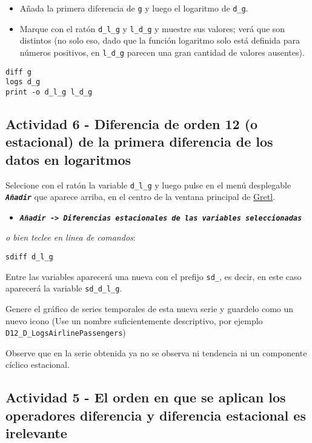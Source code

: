 \documentclass[11pt]{article}
\begin{document}
\begin{itemize}
\item Añada la primera diferencia de \texttt{g} y luego el logaritmo de \texttt{d\_g}.
\item Marque con el ratón \texttt{d\_l\_g} y \texttt{l\_d\_g} y muestre sus valores; verá
que son distintos (no solo eso, dado que la función logaritmo solo
está definida para números positivos, en \texttt{l\_d\_g} parecen una gran
cantidad de valores ausentes).
\end{itemize}

\begin{verbatim}
diff g
logs d_g
print -o d_l_g l_d_g
\end{verbatim}

\subsection{Actividad 6 - Diferencia de orden 12 (o estacional) de la primera diferencia de los datos en logaritmos}
\label{sec:org5393791}
Selecione con el ratón la variable \texttt{d\_l\_g} y luego pulse en el menú desplegable \textbf{\emph{\texttt{Añadir}}} que aparece arriba, en el centro de la
ventana principal de \href{https://gretl.sourceforge.net/es.html}{Gretl}.
\begin{itemize}
\item \textbf{\emph{\texttt{Añadir -> Diferencias estacionales de las variables seleccionadas}}}
\end{itemize}

{\vspace{0pt} \footnotesize \color{gray!70!black}
\emph{o bien teclee en linea de comandos}: 
\begin{verbatim}
sdiff d_l_g
\end{verbatim}
}

Entre las variables aparecerá una nueva con el prefijo \texttt{sd\_}, es
decir, en este caso aparecerá la variable \texttt{sd\_d\_l\_g}.

Genere el gráfico de series temporales de esta nueva serie y guardelo
como un nuevo icono (Use un nombre suficientemente descriptivo, por
ejemplo \texttt{D12\_D\_LogsAirlinePassengers})

Observe que en la serie obtenida ya no se observa ni tendencia ni un
componente cíclico estacional.

\subsection{Actividad 5 - El orden en que se aplican los operadores diferencia y diferencia estacional es irelevante}
\label{sec:org2137e3a}
\end{document}
